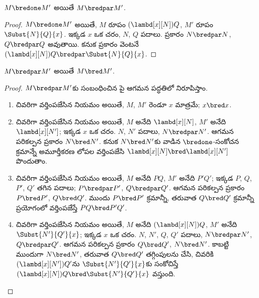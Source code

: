 \documentclass[../../../include/open-logic-section]{subfiles}
\begin{document}


\begin{lem}
  $M \bredone M'$ అయితే $M \bredpar M'$.
\end{lem}
\begin{proof} $M \bredone M'$ అయితే,
    $M$ రూపం $(\lambd[x][N])Q$, $M'$ రూపం
    $\Subst{N}{Q}{x}$. ఇక్కడ
    $x$ ఒక చరం, $N$, $Q$ పదాలు. 
    ప్రకారం $N \bredpar N$, $Q \bredpar Q$ అవుతాయి. కనుక
    ప్రకారం వెంటనే $(\lambd[x][N])Q
    \bredpar \Subst{N}{Q}{x}$.
\end{proof}

\begin{lem}
  $M \bredpar M'$ అయితే $M \bred M'$.
\end{lem}

\begin{proof} $M \bredpar M'$కు సంబంధించిన
  పై ఆగమన పద్ధతిలో నిరూపిస్తాం.
  \begin{enumerate}
  \item చివరిగా వర్తింపజేసిన నియమం  అయితే,
    $M$, $M'$ రెండూ $x$ మాత్రమే; $x \bred x$.
  \item చివరిగా వర్తింపజేసిన నియమం  అయితే, $M$ అనేది
    $\lambd[x][N]$, $M'$ అనేది $\lambd[x][N']$;
    ఇక్కడ $x$ ఒక చరం. $N$, $N'$ పదాలు, $N \bredpar N'$. ఆగమన పరికల్పన ప్రకారం
    $N \bred N'$. కనుక $N \bred N'$కు వాడిన
    $\bredone$-సంకోచన క్రమాన్నే అమూర్తీకరణ లోపల
    వర్తింపజేసి $\lambd[x][N] \bred
    \lambd[x][N']$ పొందుతాం.
  \item చివరిగా వర్తింపజేసిన నియమం  అయితే, $M$ అనేది
    $PQ$, $M'$ అనేది $P'Q'$; ఇక్కడ $P$, $Q$,
    $P'$, $Q'$ తగిన పదాలు; $P \bredpar P'$,
    $Q \bredpar Q'$. ఆగమన పరికల్పన ప్రకారం
    $P \bred P'$, $Q \bred Q'$. ముందు $P \bred P'$
    క్రమాన్నీ, తరువాత $Q \bred Q'$ క్రమాన్నీ ప్రయోగంలో
    వర్తింపజేస్తే $PQ \bred P'Q'$.
  \item చివరిగా వర్తింపజేసిన నియమం  అయితే, $M$ అనేది
    $(\lambd[x][N])Q$, $M'$ అనేది $\Subst{N'}{Q'}{x}$;
    ఇక్కడ $x$ ఒక చరం. $N$, $N'$, $Q$, $Q'$ పదాలు,
    $N \bredpar N'$, $Q \bredpar Q'$.
    ఆగమన పరికల్పన ప్రకారం $Q \bred Q'$,
    $N \bred N'$. కాబట్టి ముందుగా $N \bred N'$,
    తరువాత $Q \bred Q'$ తగ్గింపులను చేసి, చివరికి
    $(\lambd[x][N'])Q'$ను $\Subst{N'}{Q'}{x}$కు
    సంకోచిస్తే $(\lambd[x][N])Q \bred
    \Subst{N'}{Q'}{x}$ వస్తుంది.
  \end{enumerate}
\end{proof}
\end{document}

